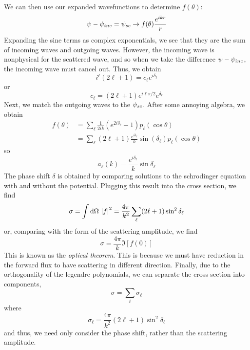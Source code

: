 We can then use our expanded wavefunctions to determine \(f(\theta)\):
\[\psi-\psi_{inc} = \psi_{sc}\rightarrow f(\theta)\frac{e^{ikr}}{r}\]
Expanding the sine terms as complex exponentials, we see that they are the sum of incoming waves and outgoing waves. However, the incoming wave is nonphysical for the scattered wave, and so when we take the difference \(\psi-\psi_{inc}\), the incoming wave must cancel out. Thus, we obtain
\[i^\ell(2\ell+1) = c_\ell e^{i\delta_\ell}\]
or
\begin{equation}
	c_\ell = (2\ell+1) e^{i\ell\pi/2}e^{\delta_\ell}
\end{equation}
Next, we match the outgoing waves to the \(\psi_{sc}\). After some annoying algebra, we obtain
\begin{align*}
	f(\theta) &= \sum_\ell \frac{1}{2ik}\left(e^{2i\delta_\ell}-1\right)p_\ell(\cos\theta)\\
		  &=\sum_\ell (2\ell+1)\frac{e^{i\delta_\ell}}{k}\sin(\delta_\ell) p_\ell(\cos\theta)
\end{align*}
so
\begin{equation}
	a_\ell(k) = \frac{e^{i\delta_\ell}}{k}\sin\delta_\ell
\end{equation}
The phase shift \(\delta\) is obtained by comparing solutions to the schrodinger equation with and without the potential. Plugging this result into the cross section, we find
\begin{equation}
	\sigma=\int\d\Omega \abs f^2 = \frac{4\pi}{k^2}\sum_\ell (2\ell+1)\sin^2\delta_\ell
\end{equation}
or, comparing with the form of the scattering amplitude, we find
\begin{equation}
	\sigma = \frac{4\pi}{k}\Im[f(0)]
\end{equation}
This is known as the \emph{optical theorem}. This is because we must have reduction in the forward flux to have scattering in different direction. Finally, due to the orthogonality of the legendre polynomials, we can separate the cross section into components, 
\[\sigma = \sum_\ell \sigma_\ell\]
where
\begin{equation}
	\sigma_\ell = \frac{4\pi}{k^2}(2\ell+1)\sin^2\delta_\ell
\end{equation}
and thus, we need only consider the phase shift, rather than the scattering amplitude.
